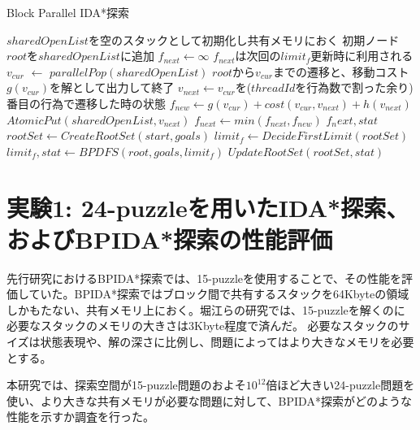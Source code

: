 \documentclass[a4paper,11pt,oneside,openany]{jsbook}
\begin{document}
\newpage
\begin{algorithm}[H]
\caption{Block Parallel IDA*探索}
\label{alg:pbnf}
\begin{algorithmic}[1]
    \State $sharedOpenList$を空のスタックとして初期化し共有メモリにおく
    \State 初期ノード$root$を$sharedOpenList$に追加
    \State $f_{next} \leftarrow \infty$
    \State $f_{next}$は次回の$limit_f$更新時に利用される 
        \State $v_{cur}$ $\leftarrow$ ${parallelPop}(sharedOpenList)$
            \State $root$から$v_{cur}$までの遷移と、移動コスト$g(v_{cur})$を解として出力して終了
        \EndIf
        \State $v_{next} \gets $$v_{cur}$を($threadId$を行為数で割った余り)番目の行為で遷移した時の状態
        \State $f_{new} \leftarrow g(v_{cur}) + cost(v_{cur}, v_{next}) + h(v_{next})$
            \State ${AtomicPut}(sharedOpenList, v_{next})$ 
        \Else
            \State $f_{next} \leftarrow min(f_{next}, f_{new})$
        \EndIf
    \EndWhile
    \State \Return $f_next, stat$
\EndFunction
{}
    \State $rootSet \gets {CreateRootSet}(start, goals)$
    \State $limit_f \leftarrow {DecideFirstLimit}(rootSet)$
            \State $limit_f, stat \gets {BPDFS}(root, goals, limit_f)$
        \EndParallelForByBlocks
        \State $UpdateRootSet(rootSet, stat)$
    \EndWhile
\EndFunction

\end{algorithmic}
\end{algorithm}
\newpage

\section{実験1: 24-puzzleを用いたIDA*探索、およびBPIDA*探索の性能評価}
先行研究におけるBPIDA*探索\cite{HA17}では、15-puzzleを使用することで、その性能を評価していた。BPIDA*探索ではブロック間で共有するスタックを64Kbyteの領域しかもたない、共有メモリ上におく。堀江らの研究では、15-puzzleを解くのに必要なスタックのメモリの大きさは3Kbyte程度で済んだ。
必要なスタックのサイズは状態表現や、解の深さに比例し、問題によってはより大きなメモリを必要とする。

本研究では、探索空間が15-puzzle問題のおよそ$10^{12}$倍ほど大きい24-puzzle問題を使い、より大きな共有メモリが必要な問題に対して、BPIDA*探索がどのような性能を示すか調査を行った。
\end{document}
